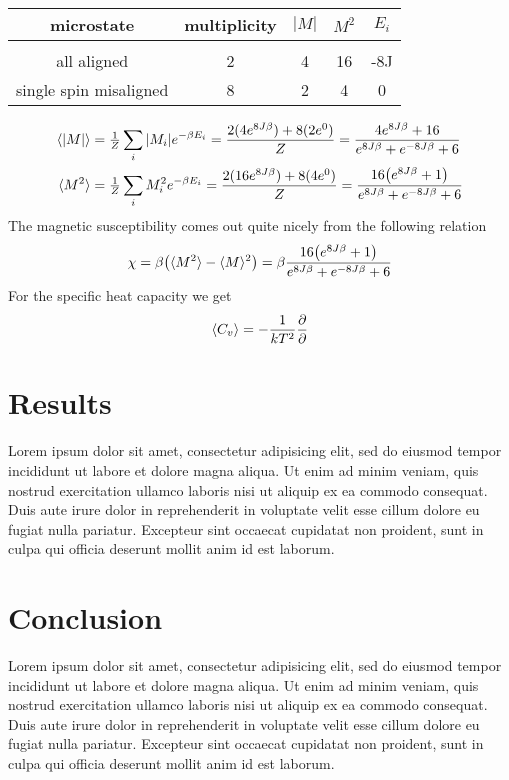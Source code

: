\documentclass[a4paper, 12pt]{article}
\newcommand{\expect}[1]{\langle #1 \rangle}
\begin{document}
	\begin{center}
	\begin{tabular}{c c c c c}
		microstate	&	multiplicity	&	$|M|$	&	$M^2$ 	&	$E_i$\\
		\hline \\
		all aligned	&	2	&	4	&	16	&	-8J\\
		single spin misaligned & 8	&	2	&	4	&	0
	\end{tabular}
	\end{center}

	\begin{align*}
		\langle \abs{M} \rangle & = \tfrac{1}{Z} \sum_{i}\abs{M_i}e^{-\beta E_i} = \frac{2(4e^{8J\beta}) + 8(2e^{0})}{Z} = 
		\frac{4e^{8J\beta}+16}{e^{8J\beta}+e^{-8J\beta}+6}\\
		\langle M^2 \rangle & = \tfrac{1}{Z} \sum_{i}M_i^2e^{-\beta E_i} = \frac{2(16e^{8J\beta}) + 8(4e^{0})}{Z} = 
		\frac{16\qty(e^{8J\beta}+1)}{e^{8J\beta}+e^{-8J\beta}+6}\\
	\end{align*}
	The magnetic susceptibility comes out quite nicely from the following relation
	\begin{equation*}
		\chi = \beta \qty( \expect{M^2} - \expect{M}^2 ) = \beta \frac{16\qty(e^{8J\beta}+1)}{e^{8J\beta}+e^{-8J\beta}+6}
	\end{equation*}
	For the specific heat capacity we get
	\begin{equation}
		\expect{C_v} = -\frac{1}{kT^2}\pdv{}
	\end{equation}

	\newpage

\section{Results}
	Lorem ipsum dolor sit amet, consectetur adipisicing elit, sed do eiusmod
	tempor incididunt ut labore et dolore magna aliqua. Ut enim ad minim veniam,
	quis nostrud exercitation ullamco laboris nisi ut aliquip ex ea commodo
	consequat. Duis aute irure dolor in reprehenderit in voluptate velit esse
	cillum dolore eu fugiat nulla pariatur. Excepteur sint occaecat cupidatat non
	proident, sunt in culpa qui officia deserunt mollit anim id est laborum.

	\newpage

\section{Conclusion}
	Lorem ipsum dolor sit amet, consectetur adipisicing elit, sed do eiusmod
	tempor incididunt ut labore et dolore magna aliqua. Ut enim ad minim veniam,
	quis nostrud exercitation ullamco laboris nisi ut aliquip ex ea commodo
	consequat. Duis aute irure dolor in reprehenderit in voluptate velit esse
	cillum dolore eu fugiat nulla pariatur. Excepteur sint occaecat cupidatat non
	proident, sunt in culpa qui officia deserunt mollit anim id est laborum.
\end{document}
